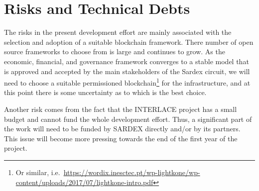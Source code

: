 






\section{Risks and Technical Debts}\label{section-technical-risks}
The risks in the present development effort are mainly associated with the selection and adoption of a suitable blockchain framework. There number of open source frameworks to choose from is large and continues to grow. As the economic, financial, and governance framework converges to a stable model that is approved and accepted by the main stakeholders of the Sardex circuit, we will need to choose a suitable permissioned blockchain\footnote{Or similar, i.e.\ \url{https://wordix.inesctec.pt/wp-lightkone/wp-content/uploads/2017/07/lightkone-intro.pdf}} for the infrastructure, and at this point there is some uncertainty as to which is the best choice.

Another risk comes from the fact that the INTERLACE project has a small budget and cannot fund the whole development effort. Thus, a significant part of the work will need to be funded by SARDEX directly and/or by its partners. This issue will become more pressing towards the end of the first year of the project.

